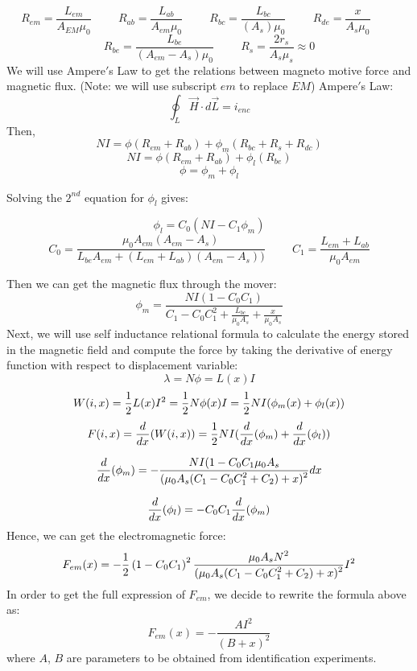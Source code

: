 \documentclass[letterpaper]{article}
\begin{document}
$$ R_{em} = \frac{L_{em}}{A_{EM}\mu_{0}}  \hspace{1cm} R_{ab} = \frac{L_{ab}}{A_{em}\mu_{0}} \hspace{1cm} R_{bc} = \frac{L_{bc}}{(A_{s})\mu_{0}} \hspace{1cm} R_{de} = \frac{x}{A_{s}\mu_{0}} \hspace{1cm} $$ $$ R_{be} = \frac{L_{be}}{(A_{em} - A_{s})\mu_{0}}  \hspace{1cm}  R_{s} = \frac{2r_{s}}{A_{s}\mu_{s}} \approx 0$$
We will use Ampere$\prime$s Law to get the relations between magneto motive force and magnetic flux. (Note: we will use subscript $em$ to replace $EM$) Ampere$\prime$s Law:
$$\oint_L \vec{H}\cdot d\vec{L} = i_{enc}$$
Then,
$$ NI = \phi \left (R_{em} + R_{ab}\right) + \phi_{m} \left( R_{bc}+R_{s}+R_{dc} \right) $$
$$ NI = \phi \left( R_{em} + R_{ab} \right) + \phi_{l} \left( R_{be} \right) $$
$$ \phi = \phi_{m} + \phi_{l} $$

Solving the $2^{nd}$ equation for $\phi_{l}$ gives:

$$\phi_{l} = C_{0}\left( NI-C_{1}\phi_{m} \right)$$ 
$$C_{0} = \frac{\mu_{0} A_{em} (A_{em} - A_{s})}{L_{be} A_{em} + (L_{em} + L_{ab})(A_{em} - A_{s}))} \hspace{1cm} 
C_{1} = \frac{L_{em} + L_{ab}}{\mu_{0} A_{em}} $$

Then we can get the magnetic flux through the mover:
$$ \phi_{m} = \frac{NI(1-C_{0}C_{1})}{C_{1} - C_{0} C_{1}^2 + \frac{L_{bc}}{\mu_{0} A_{s}} + \frac{x}{\mu_{0} A_{s}}} $$
Next, we will use self inductance relational formula to calculate the energy stored in the magnetic field and compute the force by taking the derivative of energy function with respect to displacement variable:
$$ \lambda = N \phi = L(x) I $$
$$ W(i,x) = \frac{\displaystyle 1}{\displaystyle 2} L(x) I^2 = \frac{\displaystyle 1}{\displaystyle 2} N \phi(x) I =\frac{\displaystyle 1}{\displaystyle 2} N I (\phi_{m}(x) + \phi_{l}(x))$$
$$ F(i,x) = \frac{\displaystyle d}{\displaystyle dx} (W(i,x) )= \frac{\displaystyle 1}{\displaystyle 2} N I ( \frac{\displaystyle d}{\displaystyle dx} (\phi_{m}) + \frac{d}{dx} (\phi_{l})) $$

$$ \frac{\displaystyle d}{\displaystyle dx}(\phi_{m}) = - \frac{\displaystyle N I (1 - C_{0}C_{1} \mu_{0} A_{s}}{\displaystyle (\mu_{0} A_{s}(C_{1} - C_{0} C_{1}^2 + C_{2}) + x)^2} dx$$

$$ \frac{\displaystyle d}{\displaystyle dx}(\phi_{l}) = -C_{0} C_{1} \frac{\displaystyle d}{\displaystyle dx}(\phi_{m})$$
Hence, we can get the electromagnetic force:
$$ F_{em}(x) = -\frac{\displaystyle 1}{\displaystyle 2} \left( 1 - C_{0}C_{1} \right)^2 \frac{\displaystyle \mu_{0} A_{s} N^2 }{\displaystyle (\mu_{0} A_{s}(C_{1} - C_{0} C_{1}^2 + C_{2}) + x)^2} I^2 $$
In order to get the full expression of $F_{em}$, we decide to rewrite the formula above as:
$$ F_{em}(x) = -\frac{A I^2}{(B+x)^2} $$
where $A$, $B$ are parameters to be obtained from identification experiments.\\
\end{document}
